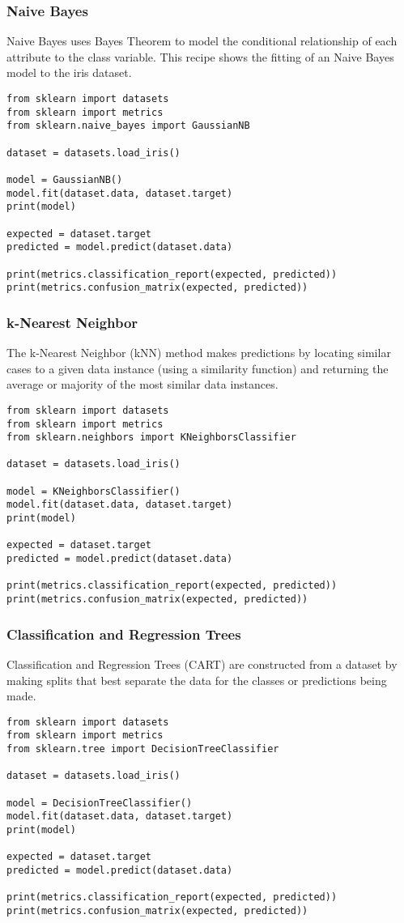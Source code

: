 \begin{frame}[fragile]\frametitle{Naive Bayes}
Naive Bayes uses Bayes Theorem to model the conditional relationship of each attribute to the class variable.
This recipe shows the fitting of an Naive Bayes model to the iris dataset.
\begin{lstlisting}
from sklearn import datasets
from sklearn import metrics
from sklearn.naive_bayes import GaussianNB

dataset = datasets.load_iris()

model = GaussianNB()
model.fit(dataset.data, dataset.target)
print(model)

expected = dataset.target
predicted = model.predict(dataset.data)

print(metrics.classification_report(expected, predicted))
print(metrics.confusion_matrix(expected, predicted))
\end{lstlisting}
\end{frame}


\begin{frame}[fragile]\frametitle{k-Nearest Neighbor}
The k-Nearest Neighbor (kNN) method makes predictions by locating similar cases to a given data instance (using a similarity function) and returning the average or majority of the most similar data instances. 
\begin{lstlisting}
from sklearn import datasets
from sklearn import metrics
from sklearn.neighbors import KNeighborsClassifier

dataset = datasets.load_iris()

model = KNeighborsClassifier()
model.fit(dataset.data, dataset.target)
print(model)

expected = dataset.target
predicted = model.predict(dataset.data)

print(metrics.classification_report(expected, predicted))
print(metrics.confusion_matrix(expected, predicted))
\end{lstlisting}
\end{frame}

\begin{frame}[fragile]\frametitle{Classification and Regression Trees}
Classification and Regression Trees (CART) are constructed from a dataset by making splits that best separate the data for the classes or predictions being made. 
\begin{lstlisting}
from sklearn import datasets
from sklearn import metrics
from sklearn.tree import DecisionTreeClassifier

dataset = datasets.load_iris()

model = DecisionTreeClassifier()
model.fit(dataset.data, dataset.target)
print(model)

expected = dataset.target
predicted = model.predict(dataset.data)

print(metrics.classification_report(expected, predicted))
print(metrics.confusion_matrix(expected, predicted))
\end{lstlisting}
\end{frame}

